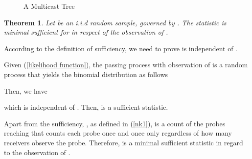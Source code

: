 \documentclass[10pt,onecolumn]{IEEEtran}
\newtheorem{theorem}{\bf Theorem}
\begin{document}
\begin{figure}
\begin{center}
\caption{A Multicast Tree} \label{tree example}
\end{center}
\end{figure}

\begin{theorem}\label{complete minimal sufficient statistics}
Let  be an i.i.d random sample, governed by  . The statistic  is minimal
sufficient for  in respect of the observation of .
\end{theorem}

\begin{IEEEproof}
According to the definition of sufficiency, we need to prove
 is independent of .

Given (\ref{likelihood function}), the passing process with observation of  is a random process that yields the binomial distribution as follows

Then, we have

which is independent of . Then,  is a sufficient statistic.

Apart from the sufficiency,
 ,  as defined in (\ref{nk1}), is a count of the probes reaching  that counts each probe once and once only regardless of how many receivers observe the probe. Therefore,   is a minimal sufficient statistic in regard to the observation of .
\end{IEEEproof}
\end{document}
